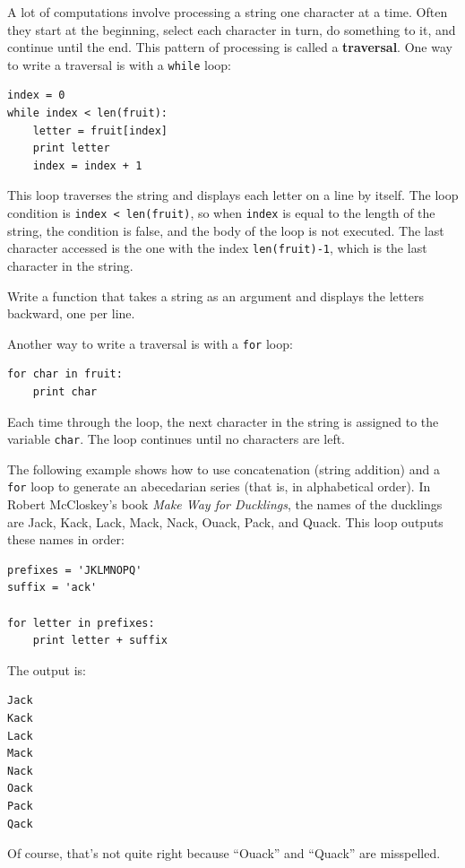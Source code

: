 \documentclass[10pt]{book}
\begin{document}
A lot of computations involve processing a string one character at a
time.  Often they start at the beginning, select each character in
turn, do something to it, and continue until the end.  This pattern of
processing is called a {\bf traversal}.  One way to write a traversal
is with a {\tt while} loop:

\begin{verbatim}
index = 0
while index < len(fruit):
    letter = fruit[index]
    print letter
    index = index + 1
\end{verbatim}
%
This loop traverses the string and displays each letter on a line by
itself.  The loop condition is {\tt index < len(fruit)}, so
when {\tt index} is equal to the length of the string, the
condition is false, and the body of the loop is not executed.  The
last character accessed is the one with the index {\tt len(fruit)-1},
which is the last character in the string.

\begin{exercise}

Write a function that takes a string as an argument
and displays the letters backward, one per line.

\end{exercise}

Another way to write a traversal is with a {\tt for} loop:

\begin{verbatim}
for char in fruit:
    print char
\end{verbatim}
%
Each time through the loop, the next character in the string is assigned
to the variable {\tt char}.  The loop continues until no characters are
left.

The following example shows how to use concatenation (string addition)
and a {\tt for} loop to generate an abecedarian series (that is, in
alphabetical order).  In Robert McCloskey's book {\em Make
Way for Ducklings}, the names of the ducklings are Jack, Kack, Lack,
Mack, Nack, Ouack, Pack, and Quack.  This loop outputs these names in
order:

\begin{verbatim}
prefixes = 'JKLMNOPQ'
suffix = 'ack'

for letter in prefixes:
    print letter + suffix
\end{verbatim}
%
The output is:

\begin{verbatim}
Jack
Kack
Lack
Mack
Nack
Oack
Pack
Qack
\end{verbatim}
%
Of course, that's not quite right because ``Ouack'' and
``Quack'' are misspelled.
\end{document}

